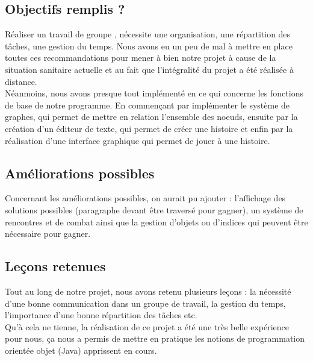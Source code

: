 \documentclass[12pt]{article}
\begin{document}
  \subsection{Objectifs remplis ?}
  Réaliser un travail de groupe , nécessite une organisation, une répartition des tâches, une gestion du temps. Nous avons eu un peu de mal à mettre en place toutes ces recommandations pour mener à bien notre projet à cause de la situation sanitaire actuelle et au fait que l'intégralité du projet a été réalisée à distance.\\  Néanmoins, nous avons presque tout implémenté en ce qui concerne les fonctions de base de notre programme. En commençant par implémenter le système de graphes, qui permet de mettre en relation l'ensemble des noeuds, ensuite par la création d'un éditeur de texte, qui permet de créer une histoire et enfin par la réalisation d'une interface graphique qui permet de jouer à une histoire.
  \subsection{Améliorations possibles}
  Concernant les améliorations possibles, on aurait pu ajouter : l'affichage des solutions possibles (paragraphe devant être traversé pour gagner), un système de rencontres et de combat ainsi que la gestion d'objets ou d'indices qui peuvent être nécessaire pour gagner.
  \subsection{Leçons retenues}
  Tout au long de notre projet, nous avons retenu plusieurs leçons : la nécessité d'une bonne communication dans un groupe de travail, la gestion du temps, l'importance d'une bonne répartition des tâches etc.\\ Qu'à cela ne tienne, la réalisation de ce projet a été une très belle expérience pour nous, ça nous a permis de mettre en pratique les notions de programmation orientée objet (Java) apprissent en cours.
  
    
\end{document}
